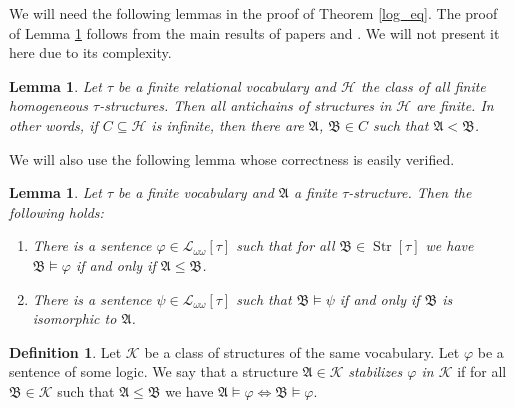 \documentclass{ndjflart}
\theoremstyle{plain}
\newtheorem{lemma}[conjecture]{Lemma}
\theoremstyle{definition}
\newtheorem{definition}[conjecture]{Definition}
\numberwithin{equation}{section}
\DeclareMathOperator{\Str}{Str}
\begin{document}
We will need the following lemmas in the proof of Theorem \ref{log_eq}.
The proof of Lemma \ref{shrinking} follows from the main results of papers \cite{Cherlin:1986} and \cite{Lachlan:1984}. We will not present it here due to its complexity. 

\begin{lemma}\label{shrinking}
Let $\tau$ be a finite relational vocabulary and $\mathcal{H}$ the class of all finite homogeneous $\tau$-structures. Then all antichains of structures in $\mathcal{H}$ are finite. In other words, if $C \subseteq \mathcal{H}$ is infinite, then there are $\mathfrak{A}$, $\mathfrak{B} \in C$ such that $\mathfrak{A} < \mathfrak{B}$.
\end{lemma}

We will also use the following lemma whose correctness is easily verified. 

\begin{lemma}\label{substr}
Let $\tau$ be a finite vocabulary and $\mathfrak{A}$ a finite $\tau$-structure.
Then the following holds:
\begin{enumerate}
\item There is a sentence $\varphi \in \mathcal{L}_{\omega\omega}[\tau]$ such that
for all $\mathfrak{B}\in \Str[\tau]$ we have
$\mathfrak{B} \vDash \varphi$ if and only if $\mathfrak{A} \leq \mathfrak{B}$.
\item There is a sentence $\psi \in \mathcal{L}_{\omega\omega}[\tau]$ such that
$\mathfrak{B} \vDash \psi$ if and only if $\mathfrak{B}$ is isomorphic to $\mathfrak{A}$.
\end{enumerate} 
\end{lemma}

\begin{definition}
Let $\mathcal{K}$ be a class of structures of the same vocabulary.
Let $\varphi$ be a sentence of some logic.
We say that a structure $\mathfrak{A}\in\mathcal{K}$ \emph{stabilizes $\varphi$ in $\mathcal{K}$} if for all $\mathfrak{B} \in \mathcal{K}$ such that $\mathfrak{A}\leq\mathfrak{B}$ we have $\mathfrak{A} \vDash \varphi \Leftrightarrow \mathfrak{B} \vDash \varphi$.
\end{definition}
\end{document}
